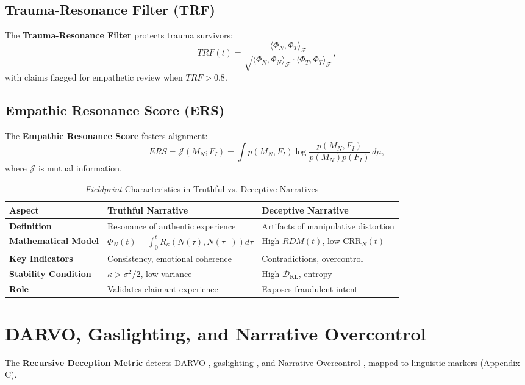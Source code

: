 \documentclass[11pt]{article}
\newcommand{\fieldprint}{\textit{Fieldprint}}
\newcommand{\rdm}{\textbf{Recursive Deception Metric}}
\newcommand{\trf}{\textbf{Trauma-Resonance Filter}}
\newcommand{\ers}{\textbf{Empathic Resonance Score}}
\begin{document}
\subsection{Trauma-Resonance Filter (TRF)}
\label{subsec:trf}
The \trf{} protects trauma survivors:
\[
TRF(t) = \frac{\langle \Phi_N, \Phi_T \rangle_\mathcal{F}}{\sqrt{\langle \Phi_N, \Phi_N \rangle_\mathcal{F} \cdot \langle \Phi_T, \Phi_T \rangle_\mathcal{F}}},
\]
with claims flagged for empathetic review when \(TRF > 0.8\).

\subsection{Empathic Resonance Score (ERS)}
\label{subsec:ers}
The \ers{} fosters alignment:
\[
ERS = \mathcal{J}(M_N; F_I) = \int p(M_N, F_I) \log \frac{p(M_N, F_I)}{p(M_N) p(F_I)} \, d\mu,
\]
where \(\mathcal{J}\) is mutual information.

\begin{table}[htbp]
\small
\centering
\caption{\fieldprint{} Characteristics in Truthful vs. Deceptive Narratives}
\begin{tabular}{p{4cm}p{4.5cm}p{4.5cm}}
\toprule
\textbf{Aspect} & \textbf{Truthful Narrative} & \textbf{Deceptive Narrative} \\
\midrule
\textbf{Definition} & Resonance of authentic experience & Artifacts of manipulative distortion \\
\textbf{Mathematical Model} & \(\Phi_N(t) = \int_0^t R_\kappa(N(\tau), N(\tau^-)) d\tau\) & High \(RDM(t)\), low \(\text{CRR}_N(t)\) \\
\textbf{Key Indicators} & Consistency, emotional coherence & Contradictions, overcontrol \\
\textbf{Stability Condition} & \(\kappa > \sigma^2/2\), low variance & High \(\mathcal{D}_{\text{KL}}\), entropy \\
\textbf{Role} & Validates claimant experience & Exposes fraudulent intent \\
\bottomrule
\end{tabular}
\label{tab:fieldprint}
\end{table}

\section{DARVO, Gaslighting, and Narrative Overcontrol}
\label{sec:distortions}
The \rdm{} detects DARVO \citep{freyd1997}, gaslighting \citep{sweet2019}, and Narrative Overcontrol \citep{havens2025b}, mapped to linguistic markers (Appendix C).
\end{document}
